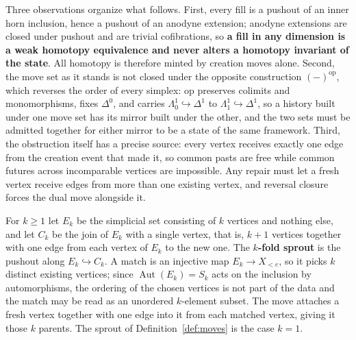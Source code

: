 Three observations organize what follows.
First, every fill is a pushout of an inner horn inclusion, hence a pushout of an anodyne extension; anodyne extensions are closed under pushout and are trivial cofibrations, so \textbf{a fill in any dimension is a weak homotopy equivalence and never alters a homotopy invariant of the state}.
All homotopy is therefore minted by creation moves alone.
Second, the move set as it stands is not closed under the opposite construction $(-)^{\mathrm{op}}$, which reverses the order of every simplex: $\mathrm{op}$ preserves colimits and monomorphisms, fixes $\Delta^0$, and carries $\Lambda^1_0 \hookrightarrow \Delta^1$ to $\Lambda^1_1 \hookrightarrow \Delta^1$, so a history built under one move set has its mirror built under the other, and the two sets must be admitted together for either mirror to be a state of the same framework.
Third, the obstruction itself has a precise source: every vertex receives exactly one edge from the creation event that made it, so common pasts are free while common futures across incomparable vertices are impossible.
Any repair must let a fresh vertex receive edges from more than one existing vertex, and reversal closure forces the dual move alongside it.

\begin{definition}
\label{def:kfold}
For $k \geq 1$ let $E_k$ be the simplicial set consisting of $k$ vertices and nothing else, and let $C_k$ be the join of $E_k$ with a single vertex, that is, $k+1$ vertices together with one edge from each vertex of $E_k$ to the new one.
The \textbf{$k$-fold sprout} is the pushout along $E_k \hookrightarrow C_k$.
A match is an injective map $E_k \to X_{<e}$, so it picks $k$ distinct existing vertices; since $\operatorname{Aut}(E_k) = S_k$ acts on the inclusion by automorphisms, the ordering of the chosen vertices is not part of the data and the match may be read as an unordered $k$-element subset.
The move attaches a fresh vertex together with one edge into it from each matched vertex, giving it those $k$ parents.
The sprout of Definition~\ref{def:moves} is the case $k = 1$.
\end{definition}

